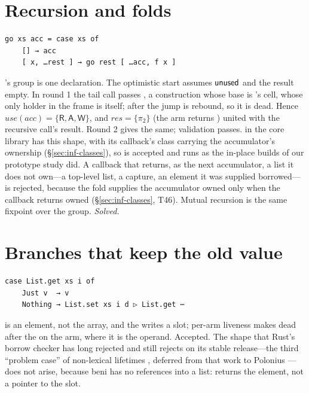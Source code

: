 \section{Recursion and folds}
\label{sec:hard-recursion}

\begin{Verbatim}
go xs acc = case xs of
    [] → acc
    [ x, …rest ] → go rest [ …acc, f x ]
\end{Verbatim}
's group is one declaration. The optimistic start assumes  $\mathsf{unused}$ and the result
empty. In round 1 the tail call passes \code{[ …acc, f x ]}, a construction whose base is 's
cell, whose only holder in the frame is  itself; after the jump  is rebound, so it
is dead. Hence $\mathit{use}(\mathit{acc}) = \{\mathsf{R}, \mathsf{A}, \mathsf{W}\}$, and $\mathit{res} =
\{\pi_2\}$ (the \code{[]} arm returns ) united with the recursive call's result. Round 2 gives
the same; validation passes.  in the core library has this shape, with its callback's
class carrying the accumulator's ownership (\S\ref{sec:inf-classes}), so
 is accepted and runs as the in-place builds of our
prototype study did. A callback that returns, as the next accumulator, a list it does not own---a
top-level list, a capture, an element it was supplied borrowed---is rejected, because the fold supplies
the accumulator owned only when the callback returns owned (\S\ref{sec:inf-classes}, T46). Mutual recursion
is the same fixpoint over the group. \emph{Solved.}

\section{Branches that keep the old value}
\label{sec:hard-branches}

\begin{Verbatim}
case List.get xs i of
    Just v  → v
    Nothing → List.set xs i d ▷ List.get ⋯
\end{Verbatim}
 is an element, not the array, and the  writes a slot; per-arm liveness makes
 dead after the  on the  arm, where it is the operand. Accepted. The
shape that Rust's borrow checker has long rejected and still rejects on its stable release---the third
``problem case'' of non-lexical lifetimes \citep{rfc2094}, deferred from that work to Polonius
\citep{matsakis2018alias}---does not arise, because beni has no references into a list: 
returns the element, not a pointer to the slot.

